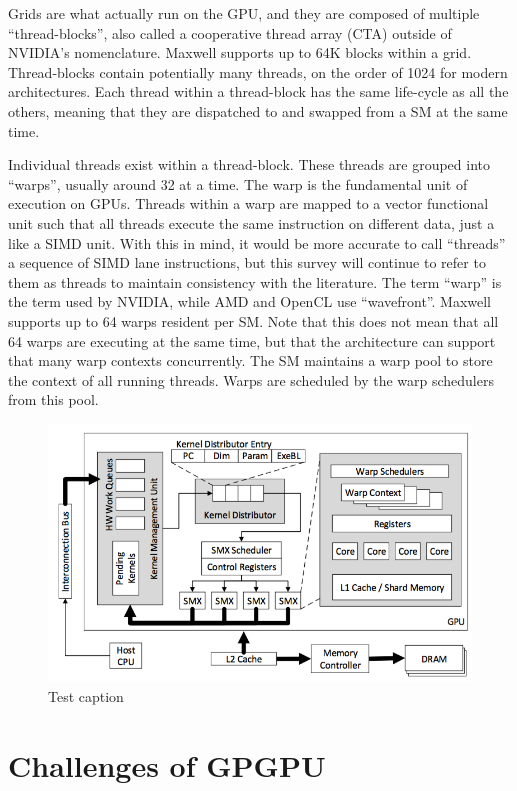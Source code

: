 \documentclass[prodmode,acmtecs]{acmsmall} %
\begin{document}
Grids are what actually run on the GPU, and they are composed of multiple
``thread-blocks'', also called a cooperative thread array (CTA) outside of
NVIDIA's nomenclature. Maxwell supports up to 64K blocks within a grid.
Thread-blocks contain potentially many threads, on the order of 1024 for modern
architectures. Each thread within a thread-block has the same life-cycle as all
the others, meaning that they are dispatched to and swapped from a SM at the
same time.

Individual threads exist within a thread-block. These threads are grouped into
``warps'', usually around 32 at a time. The warp is the fundamental unit of
execution on GPUs. Threads within a warp are mapped to a vector functional unit
such that all threads execute the same instruction on different data, just a
like a SIMD unit. With this in mind, it would be more accurate to call
``threads'' a sequence of SIMD lane instructions, but this survey will continue
to refer to them as threads to maintain consistency with the literature. The
term ``warp'' is the term used by NVIDIA, while AMD and OpenCL use
``wavefront''. Maxwell supports up to 64 warps resident per SM. Note that this
does not mean that all 64 warps are executing at the same time, but that the
architecture can support that many warp contexts concurrently. The SM maintains
a warp pool to store the context of all running threads. Warps are scheduled by
the warp schedulers from this pool.

\begin{figure}
  \centering
  \includegraphics[]{BaselineGPU.png} \caption{Test caption} \label{fig:baseline}
\end{figure}

\section{Challenges of GPGPU} \label{sec:challenges}
\end{document}
